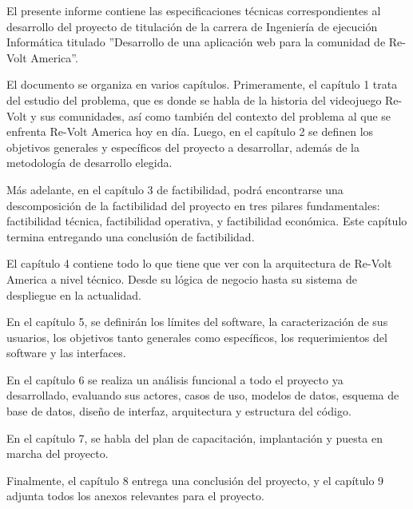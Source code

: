 El presente informe contiene las especificaciones técnicas correspondientes al desarrollo del proyecto de titulación de la carrera de Ingeniería de ejecución Informática titulado ''Desarrollo de una aplicación web para la comunidad de Re-Volt America''.

El documento se organiza en varios capítulos. Primeramente, el capítulo 1 trata del estudio del problema, que es donde se habla de la historia del videojuego Re-Volt y sus comunidades, así como también del contexto del problema al que se enfrenta Re-Volt America hoy en día. Luego, en el capítulo 2 se definen los objetivos generales y específicos del proyecto a desarrollar, además de la metodología de desarrollo elegida.

Más adelante, en el capítulo 3 de factibilidad, podrá encontrarse una descomposición de la factibilidad del proyecto en tres pilares fundamentales: factibilidad técnica, factibilidad operativa, y factibilidad económica. Este capítulo termina entregando una conclusión de factibilidad.

El capítulo 4 contiene todo lo que tiene que ver con la arquitectura de Re-Volt America a nivel técnico. Desde su lógica de negocio hasta su sistema de despliegue en la actualidad.

En el capítulo 5, se definirán los límites del software, la caracterización de sus usuarios, los objetivos tanto generales como específicos, los requerimientos del software y las interfaces.

En el capítulo 6 se realiza un análisis funcional a todo el proyecto ya desarrollado, evaluando sus actores, casos de uso, modelos de datos, esquema de base de datos, diseño de interfaz, arquitectura y estructura del código.

En el capítulo 7, se habla del plan de capacitación, implantación y puesta en marcha del proyecto.

Finalmente, el capítulo 8 entrega una conclusión del proyecto, y el capítulo 9 adjunta todos los anexos relevantes para el proyecto.